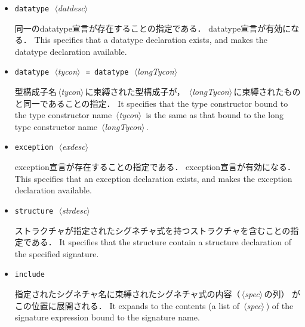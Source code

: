 \documentclass{jbook}
\newcommand{\nonterm}[1]{\mbox{$\,\langle$}{\it #1}\mbox{$\rangle\,$}}
\newcommand{\term}[1]{\mbox{{\tt #1}}}
\begin{document}
\begin{itemize}
\item \term{datatype}\  \nonterm{datdesc}

\ifjp%
	同一のdatatype宣言が存在することの指定である．
	datatype宣言が有効になる．
\else%
	This specifies that a datatype declaration exists, and makes the
datatype declaration available.
\fi%

\item \term{datatype}\  \nonterm{tycon}\  \term{=}\  \term{datatype}\  \nonterm{longTycon}

\ifjp%
	型構成子名\nonterm{tycon}に束縛された型構成子が，
\nonterm{longTycon}に束縛されたものと同一であることの指定．
\else%
	It specifies that the type constructor bound to the type
constructor name \nonterm{tycon} is the same as that bound to the
long type constructor name \nonterm{longTycon}.
\fi%

\item  \term{exception}\  \nonterm{exdesc}

\ifjp%
	exception宣言が存在することの指定である．
	exception宣言が有効になる．
\else%
	This specifies that an exception declaration exists, and makes the
exception declaration available.
\fi%

\item \term{structure}\  \nonterm{strdesc}

\ifjp%
	ストラクチャが指定されたシグネチャ式を持つストラクチャを含むことの指定である．
\else%
	It specifies that the structure contain a structure declaration
of the specified signature.
\fi%
	
\item \term{include}

\ifjp%
	指定されたシグネチャ名に束縛されたシグネチャ式の内容（\nonterm{spec}の列）
がこの位置に展開される．
\else%
	It expands to the contents (a list of \nonterm{spec}) of the
signature expression bound to the signature name.
\fi%


\end{itemize}
\end{document}

